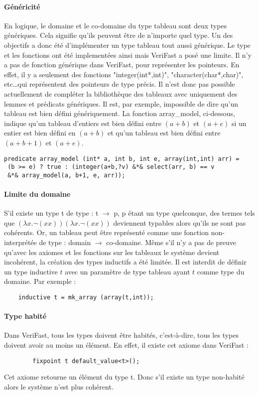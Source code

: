 \documentclass[11pt,openany]{article}
\newcommand{\verifast}{VeriFast}
\begin{document}
			\paragraph{G\'en\'ericit\'e}
			En logique, le domaine et le co-domaine du type tableau sont deux types g\'en\'eriques. Cela signifie qu'ils peuvent \^etre de n'importe quel type. Un des objectifs a donc \'et\'e d'impl\'ementer un type tableau tout aussi g\'en\'erique. Le type et les fonctions ont \'et\'e implement\'ees ainsi mais \verifast{} a pos\'e une limite. Il n'y a pas de fonction g\'en\'erique dans \verifast, pour repr\'esenter les pointeurs. En effet, il y a seulement des fonctions "integer(int*,int)", "character(char*,char)", etc\ldots qui repr\'esentent des pointeurs de type pr\'ecis. Il n'est donc pas possible actuellement de compl\'eter la biblioth\`eque des tableaux avec uniquement des lemmes et pr\'edicats g\'en\'eriques. Il est, par exemple, impossible de dire qu'un tableau est bien d\'efini g\'en\'eriquement. La fonction array\_model, ci-dessous, indique qu'un tableau d'entiers est bien d\'efini entre $(a+b)$ et $(a+e)$ si un entier est bien d\'efini en $(a+b)$ et qu'un tableau est bien d\'efini entre $(a+b+1)$ et $(a+e)$.
\begin{lstlisting}
predicate array_model (int* a, int b, int e, array(int,int) arr) =
 (b >= e) ? true : (integer(a+b,?v) &*& select(arr, b) == v
 &*& array_model(a, b+1, e, arr));
\end{lstlisting}
			\paragraph{Limite du domaine}
			S'il existe un type t de type : t $\rightarrow$ p, p \'etant un type quelconque, des termes tels que $(\lambda x. \neg(xx))(\lambda x.\neg(xx))$ 	deviennent typables alors qu'ils ne sont pas coh\'erents. Or, un tableau peut \^etre repr\'esent\'e comme une fonction non-interpr\'et\'ee de type : domain $\rightarrow$ co-domaine. M\^eme s'il n'y a pas de preuve qu'avec les axiomes et les fonctions sur les tableaux le syst\`eme devient incoh\'erent, la cr\'eation des types inductifs a \'et\'e limit\'ee. Il est interdit de d\'efinir un type inductive $t$ avec un param\`etre de type tableau ayant $t$ comme type du domaine. Par exemple :
			\begin{lstlisting}			
    inductive t = mk_array (array(t,int));
			\end{lstlisting}
			\paragraph{Type habit\'e}
				Dans \verifast{}, tous les types doivent \^etre habit\'es, c'est-\`a-dire, tous les types doivent avoir au moins un \'el\'ement. En effet, il existe cet axiome dans \verifast{} :
		\begin{lstlisting}
		fixpoint t default_value<t>();
		\end{lstlisting}
		Cet axiome retourne un \'el\'ement du type t. Donc s'il existe un type non-habit\'e alors le syst\`eme n'est plus coh\'erent.
		
\end{document}
